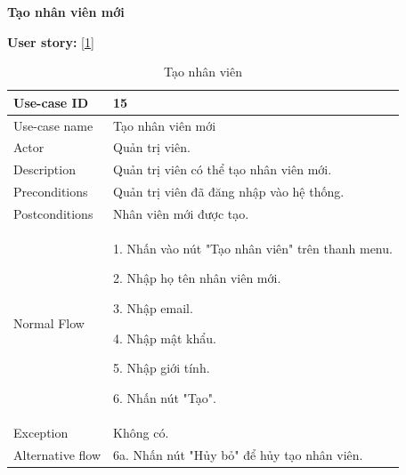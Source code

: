 \newpage
\textbf{Tạo nhân viên mới}\par
\textbf{User story:} [\ref{bang15}]
\begin{table}[!htp]
    \centering
    \begin{tabular}{|m{3cm}|m{10cm}|}
    \hline 
        Use-case ID & 15\\ \hline
        Use-case name & Tạo nhân viên mới\\ \hline
        Actor & Quản trị viên.\\ \hline
        Description & Quản trị viên có thể tạo nhân viên mới.\\ \hline
        Preconditions & Quản trị viên đã đăng nhập vào hệ thống.\\ \hline
        Postconditions & Nhân viên mới được tạo.\\ \hline
        Normal Flow & 
        1. Nhấn vào nút "Tạo nhân viên" trên thanh menu.\par 
        2. Nhập họ tên nhân viên mới.\par
        3. Nhập email.\par
        4. Nhập mật khẩu.\par
        5. Nhập giới tính.\par
        6. Nhấn nút "Tạo".
        \\ \hline
        Exception & Không có.
        \\ \hline
        Alternative flow & 
        6a. Nhấn nút "Hủy bỏ" để hủy tạo nhân viên.
        \\ 
    \hline 
    \end{tabular}
    \caption{Tạo nhân viên}
    \label{bang15}
\end{table}

